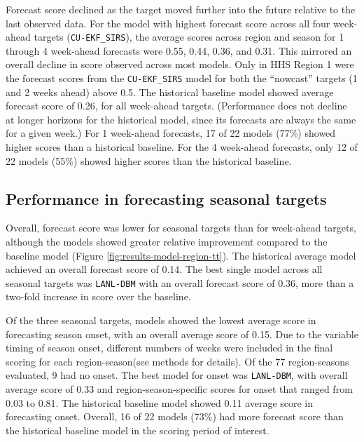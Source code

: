 \documentclass{article}\usepackage[]{graphicx}\usepackage[]{color}
\begin{document}
Forecast score declined as the target moved further into the future relative to the last observed data.
For the model with highest forecast score across all four week-ahead targets ({\tt CU-EKF\_SIRS}), the average scores across region and season for 1 through 4 week-ahead forecasts were 
0.55, 
0.44, 
0.36, and 
0.31.
This mirrored an overall decline in score observed across most models.
Only in HHS Region 1 were the forecast scores from the {\tt CU-EKF\_SIRS} model for both the ``nowcast'' targets (1 and 2 weeks ahead) above 0.5.
The historical baseline model showed average forecast score of 
0.26, 
for all week-ahead targets. 
(Performance does not decline at longer horizons for the historical model, since its forecasts are always the same for a given week.)
For 1 week-ahead forecasts, 17 of 22 models (77\%) showed higher scores than a historical baseline.
For the 4 week-ahead forecasts, only 12 of 22 models (55\%) showed higher scores than the historical baseline.

\subsection{Performance in forecasting seasonal targets}




Overall, forecast score was lower for seasonal targets than for week-ahead targets, although the models showed greater relative improvement compared to the baseline model (Figure \ref{fig:results-model-region-tt}).
The historical average model achieved  an overall forecast score of 
0.14.
The best single model across all seasonal targets was {\tt LANL-DBM} with an overall forecast score of 
0.36, more than a two-fold increase in score over the baseline.



Of the three seasonal targets, models showed the lowest average score in forecasting season onset, with an overall average score of 
0.15. 
Due to the variable timing of season onset, different numbers of weeks were included in the final scoring for each region-season(see methods for details).%
Of the 77 region-seasons evaluated, 9 had no onset. 
The best model for onset was 
{\tt LANL-DBM}, 
with overall average score of 
0.33
and region-season-specific scores for onset that ranged from
0.03 to 
0.81.
The historical baseline model showed 
0.11 average
score in forecasting onset.
Overall, 16 of 22 models (73\%) had more forecast score than the historical baseline model in the scoring period of interest.
\end{document}
